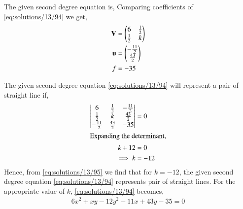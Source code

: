 The given second degree equation is,
Comparing coefficients of \eqref{eq:solutions/13/94} we get,
\begin{align}
\mathbf{V} &= \begin{pmatrix}6&\frac{1}{2}\\\frac{1}{2}&k\end{pmatrix}\\
\mathbf{u} &= \begin{pmatrix}-\frac{11}{2}\\\frac{43}{2}\end{pmatrix}\\
f &= -35
\end{align}

The given second degree equation \eqref{eq:solutions/13/94} will represent a pair of straight line if, 
\begin{align}
\begin{vmatrix}6&\frac{1}{2}&-\frac{11}{2}\\ \frac{1}{2}&k&\frac{43}{2}\\-\frac{11}{2}& \frac{43}{2}&-35\end{vmatrix}&=0\\
\intertext{Expanding the determinant,}
k+12&=0\\
\implies k&=-12\label{eq:solutions/13/95}
\end{align}
Hence, from \eqref{eq:solutions/13/95} we find that for $k=-12$, the given second degree equation \eqref{eq:solutions/13/94} represents pair of straight lines. For the appropriate value of $k$, \eqref{eq:solutions/13/94} becomes,
\begin{align}
6x^2 +xy-12y^2-11x+43y-35 = 0\label{eq:solutions/13/9main}
\end{align}

